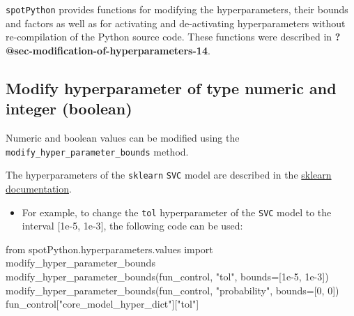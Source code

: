 \documentclass[
  letterpaper,
  DIV=11,
  numbers=noendperiod]{scrreprt}
\newenvironment{Shaded}{\begin{snugshade}}{\end{snugshade}}
\newcommand{\DecValTok}[1]{\textcolor[rgb]{0.68,0.00,0.00}{#1}}
\newcommand{\FloatTok}[1]{\textcolor[rgb]{0.68,0.00,0.00}{#1}}
\newcommand{\ImportTok}[1]{\textcolor[rgb]{0.00,0.46,0.62}{#1}}
\newcommand{\NormalTok}[1]{\textcolor[rgb]{0.00,0.23,0.31}{#1}}
\newcommand{\OperatorTok}[1]{\textcolor[rgb]{0.37,0.37,0.37}{#1}}
\newcommand{\StringTok}[1]{\textcolor[rgb]{0.13,0.47,0.30}{#1}}
\providecommand{\tightlist}{%
  \setlength{\itemsep}{0pt}\setlength{\parskip}{0pt}}\usepackage{longtable,booktabs,array}
\begin{document}
\texttt{spotPython} provides functions for modifying the
hyperparameters, their bounds and factors as well as for activating and
de-activating hyperparameters without re-compilation of the Python
source code. These functions were described in
\textbf{?@sec-modification-of-hyperparameters-14}.

\hypertarget{modify-hyperparameter-of-type-numeric-and-integer-boolean}{%
\subsection{Modify hyperparameter of type numeric and integer
(boolean)}\label{modify-hyperparameter-of-type-numeric-and-integer-boolean}}

Numeric and boolean values can be modified using the
\texttt{modify\_hyper\_parameter\_bounds} method.

\begin{tcolorbox}[enhanced jigsaw, rightrule=.15mm, opacityback=0, colframe=quarto-callout-note-color-frame, opacitybacktitle=0.6, toptitle=1mm, arc=.35mm, colbacktitle=quarto-callout-note-color!10!white, coltitle=black, toprule=.15mm, leftrule=.75mm, titlerule=0mm, title=\textcolor{quarto-callout-note-color}{\faInfo}\hspace{0.5em}{\texttt{sklearn\ Model} Hyperparameters}, bottomrule=.15mm, breakable, bottomtitle=1mm, left=2mm, colback=white]

The hyperparameters of the \texttt{sklearn} \texttt{SVC} model are
described in the
\href{https://scikit-learn.org/stable/modules/generated/sklearn.svm.SVC.html}{sklearn
documentation}.

\end{tcolorbox}

\begin{itemize}
\tightlist
\item
  For example, to change the \texttt{tol} hyperparameter of the
  \texttt{SVC} model to the interval {[}1e-5, 1e-3{]}, the following
  code can be used:
\end{itemize}

\begin{Shaded}
\begin{Highlighting}[]
\ImportTok{from}\NormalTok{ spotPython.hyperparameters.values }\ImportTok{import}\NormalTok{ modify\_hyper\_parameter\_bounds}
\NormalTok{modify\_hyper\_parameter\_bounds(fun\_control, }\StringTok{"tol"}\NormalTok{, bounds}\OperatorTok{=}\NormalTok{[}\FloatTok{1e{-}5}\NormalTok{, }\FloatTok{1e{-}3}\NormalTok{])}
\NormalTok{modify\_hyper\_parameter\_bounds(fun\_control, }\StringTok{"probability"}\NormalTok{, bounds}\OperatorTok{=}\NormalTok{[}\DecValTok{0}\NormalTok{, }\DecValTok{0}\NormalTok{])}
\NormalTok{fun\_control[}\StringTok{"core\_model\_hyper\_dict"}\NormalTok{][}\StringTok{"tol"}\NormalTok{]}
\end{Highlighting}
\end{Shaded}
\end{document}
